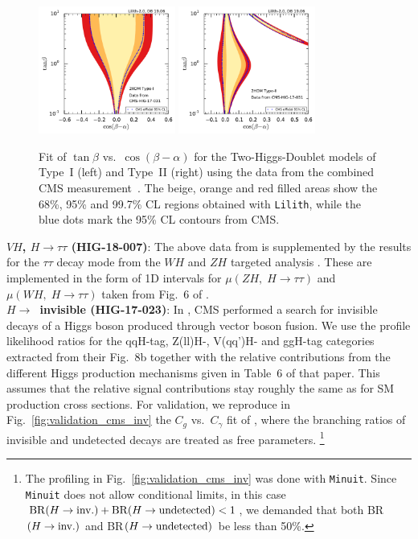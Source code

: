 \begin{figure}[t!]\centering
\includegraphics[width=0.4\textwidth]{validation/CMS/HIG-17-031-2HDM-Type1.pdf}%
\includegraphics[width=0.4\textwidth]{validation/CMS/HIG-17-031-2HDM-Type2.pdf}
\caption{Fit of $\tan\beta$ vs.\ $\cos(\beta-\alpha)$ for the Two-Higgs-Doublet models of Type~I (left) and Type~II (right) 
using the data from the combined CMS measurement~\cite{Sirunyan:2018koj}. 
The beige, orange and red filled areas show the 68\%, 95\% and 99.7\% CL regions obtained with {\tt Lilith}, 
while the blue dots mark the 95\% CL contours from CMS.}
\label{fig:validation_cms_2hdm}
\end{figure}

{\bf\boldmath $VH$, $H\to\tau\tau$ (HIG-18-007)}: The above data from \cite{Sirunyan:2018koj} is supplemented by the results 
for the $\tau\tau$ decay mode from the $WH$ and $ZH$ targeted analysis \cite{Sirunyan:2018cpi}. These are implemented in the 
form of 1D intervals for $\mu(ZH,\;H\to\tau\tau)$ and $\mu(WH,\;H\to\tau\tau)$ taken from Fig.~6 of \cite{Sirunyan:2018cpi}. \\

{\bf\boldmath $H\to$~invisible (HIG-17-023)}: 
In \cite{Sirunyan:2018owy}, CMS performed a search for invisible decays of a Higgs boson produced through vector boson fusion. 
We use the profile likelihood ratios for the qqH-tag, Z(ll)H-, V(qq')H- and ggH-tag categories extracted 
from their Fig.~8b together with the relative contributions from the different Higgs production mechanisms  
given in Table~6 of that paper. This assumes that the relative signal contributions stay roughly the same as for 
SM production cross sections. For validation, we reproduce in Fig.~\ref{fig:validation_cms_inv}
 the $C_g$ vs.\ $C_\gamma$ fit of \cite{Sirunyan:2018koj}, where the branching ratios of invisible and undetected decays 
are treated as free parameters.%
\footnote{The profiling in Fig.~\ref{fig:validation_cms_inv} was done with {\tt Minuit}. 
  Since {\tt Minuit} does not allow conditional limits, in this case ${\rm BR}(H\to {\rm inv.})+{\rm BR}(H\to {\rm undetected})<1$, 
  we demanded that both BR$(H\to {\rm inv.})$ and BR$(H\to {\rm undetected})$ be less than 50\%.} 

